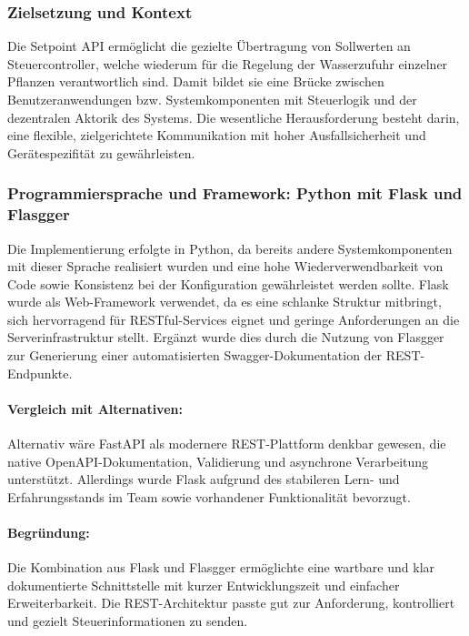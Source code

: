 \subsubsection*{Zielsetzung und Kontext}

Die Setpoint API erm\"oglicht die gezielte \"Ubertragung von Sollwerten an Steuercontroller, welche wiederum f\"ur die Regelung der Wasserzufuhr einzelner Pflanzen verantwortlich sind. Damit bildet sie eine Br\"ucke zwischen Benutzeranwendungen bzw. Systemkomponenten mit Steuerlogik und der dezentralen Aktorik des Systems. Die wesentliche Herausforderung besteht darin, eine flexible, zielgerichtete Kommunikation mit hoher Ausfallsicherheit und Ger\"atespezifit\"at zu gew\"ahrleisten.

\subsubsection*{Programmiersprache und Framework: Python mit Flask und Flasgger}

Die Implementierung erfolgte in Python, da bereits andere Systemkomponenten mit dieser Sprache realisiert wurden und eine hohe Wiederverwendbarkeit von Code sowie Konsistenz bei der Konfiguration gew\"ahrleistet werden sollte. Flask wurde als Web-Framework verwendet, da es eine schlanke Struktur mitbringt, sich hervorragend f\"ur RESTful-Services eignet und geringe Anforderungen an die Serverinfrastruktur stellt. Erg\"anzt wurde dies durch die Nutzung von Flasgger zur Generierung einer automatisierten Swagger-Dokumentation der REST-Endpunkte.\cite{flasgger_docs}

\paragraph*{Vergleich mit Alternativen:}

Alternativ w\"are FastAPI als modernere REST-Plattform denkbar gewesen, die native OpenAPI-Dokumentation, Validierung und asynchrone Verarbeitung unterst\"utzt. Allerdings wurde Flask aufgrund des stabileren Lern- und Erfahrungsstands im Team sowie vorhandener Funktionalit\"at bevorzugt.

\paragraph*{Begr\"undung:}

Die Kombination aus Flask und Flasgger erm\"oglichte eine wartbare und klar dokumentierte Schnittstelle mit kurzer Entwicklungszeit und einfacher Erweiterbarkeit. Die REST-Architektur passte gut zur Anforderung, kontrolliert und gezielt Steuerinformationen zu senden.

